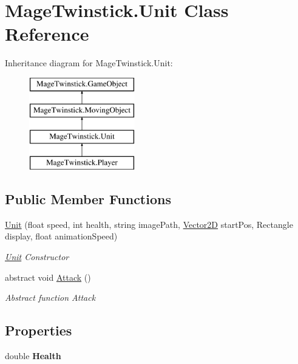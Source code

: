 \hypertarget{class_mage_twinstick_1_1_unit}{}\section{Mage\+Twinstick.\+Unit Class Reference}
\label{class_mage_twinstick_1_1_unit}
Inheritance diagram for Mage\+Twinstick.\+Unit\+:\begin{figure}[H]
\begin{center}
\leavevmode
\includegraphics[height=4.000000cm]{class_mage_twinstick_1_1_unit}
\end{center}
\end{figure}
\subsection*{Public Member Functions}
\begin{DoxyCompactItemize}
\item 
\hyperlink{class_mage_twinstick_1_1_unit_a857d0f6e0f55b4c81e2a3bbf8711dd18}{Unit} (float speed, int health, string image\+Path, \hyperlink{class_mage_twinstick_1_1_vector2_d}{Vector2\+D} start\+Pos, Rectangle display, float animation\+Speed)
\begin{DoxyCompactList}\small\item\em \hyperlink{class_mage_twinstick_1_1_unit}{Unit} Constructor \end{DoxyCompactList}\item 
abstract void \hyperlink{class_mage_twinstick_1_1_unit_a98b69920e6c6c09c5cfaacbf42a31bbf}{Attack} ()
\begin{DoxyCompactList}\small\item\em Abstract function Attack \end{DoxyCompactList}\end{DoxyCompactItemize}
\subsection*{Properties}
\begin{DoxyCompactItemize}
\item 
\hypertarget{class_mage_twinstick_1_1_unit_a5c06094e798c41a5d484f6ee00757667}{}double {\bfseries Health}\label{class_mage_twinstick_1_1_unit_a5c06094e798c41a5d484f6ee00757667}

\end{DoxyCompactItemize}
